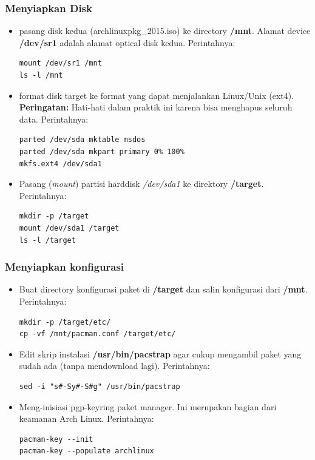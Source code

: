 \documentclass[12pt,]{article}
\begin{document}
	\subsubsection{Menyiapkan Disk}
	\begin{itemize}
		\item pasang disk kedua (archlinuxpkg\_2015.iso) ke directory \textbf{/mnt}.
		Alamat device \textbf{/dev/sr1} adalah alamat optical disk kedua.
		Perintahnya:
		\begin{verbatim}
mount /dev/sr1 /mnt
ls -l /mnt
		\end{verbatim}
		
		\item format disk target ke format yang dapat menjalankan Linux/Unix (ext4).
		\textbf{Peringatan:} Hati-hati dalam praktik ini karena bisa menghapus seluruh data.
		Perintahnya:
		\begin{verbatim}
parted /dev/sda mktable msdos
parted /dev/sda mkpart primary 0% 100%
mkfs.ext4 /dev/sda1
		\end{verbatim}
		
		\item Pasang (\textit{mount}) partisi harddisk \textit{/dev/sda1} ke direktory \textbf{/target}.
		Perintahnya:
		\begin{verbatim}
mkdir -p /target
mount /dev/sda1 /target
ls -l /target
		\end{verbatim}
	\end{itemize}	

	\subsubsection{Menyiapkan konfigurasi}
	\begin{itemize}
		\item Buat directory konfigurasi paket di \textbf{/target} dan salin konfigurasi dari \textbf{/mnt}.
		Perintahnya:
		\begin{verbatim}
mkdir -p /target/etc/
cp -vf /mnt/pacman.conf /target/etc/	
		\end{verbatim}	
		
		\item Edit skrip instalasi \textbf{/usr/bin/pacstrap} agar cukup mengambil paket yang sudah ada (tanpa mendownload lagi).
		Perintahnya:
		\begin{verbatim}
sed -i "s#-Sy#-S#g" /usr/bin/pacstrap	
		\end{verbatim}
		
		\item Meng-inisiasi pgp-keyring paket manager. Ini merupakan bagian dari keamanan Arch Linux.
		Perintahnya:
		\begin{verbatim}
pacman-key --init
pacman-key --populate archlinux
		\end{verbatim}
	\end{itemize}
	
\end{document}
